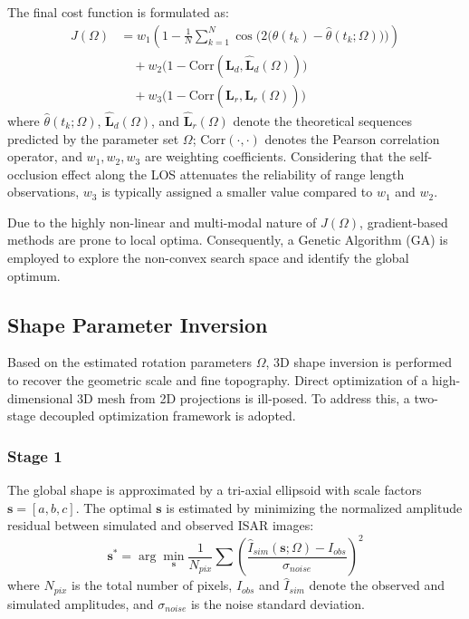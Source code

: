 \documentclass[conference]{IEEEtran}
\begin{document}
The final cost function is formulated as:
\begin{equation}
	\begin{split}
		J(\Omega) &= w_1 \left( 1 - \frac{1}{N} \sum_{k=1}^N \cos \Big( 2 \big( \theta(t_k) - \hat{\theta}(t_k; \Omega) \big) \Big) \right) \\
		&\quad + w_2 \big( 1 - \text{Corr}(\mathbf{L}_d, \hat{\mathbf{L}}_d(\Omega)) \big) \\
		&\quad + w_3 \big( 1 - \text{Corr}(\mathbf{L}_r, \hat{\mathbf{L}}_r(\Omega)) \big)
	\end{split}
\end{equation}
where $\hat{\theta}(t_k; \Omega)$, $\hat{\mathbf{L}}_d(\Omega)$, and $\hat{\mathbf{L}}_r(\Omega)$ denote the theoretical sequences predicted by the parameter set $\Omega$; $\text{Corr}(\cdot, \cdot)$ denotes the Pearson correlation operator, and $w_1, w_2, w_3$ are weighting coefficients. Considering that the self-occlusion effect along the LOS attenuates the reliability of range length observations, $w_3$ is typically assigned a smaller value compared to $w_1$ and $w_2$.

Due to the highly non-linear and multi-modal nature of $J(\Omega)$, gradient-based methods are prone to local optima. Consequently, a Genetic Algorithm (GA) is employed to explore the non-convex search space and identify the global optimum.  

\subsection{Shape Parameter Inversion}\label{Shape}

Based on the estimated rotation parameters $\Omega$, 3D shape inversion is performed to recover the geometric scale and fine topography. Direct optimization of a high-dimensional 3D mesh from 2D projections is ill-posed. To address this, a two-stage decoupled optimization framework is adopted.

\subsubsection{Stage 1}

The global shape is approximated by a tri-axial ellipsoid with scale factors $\mathbf{s} = [a, b, c]$. The optimal $\mathbf{s}$ is estimated by minimizing the normalized amplitude residual between simulated and observed ISAR images\cite{brozovic2010}:
\begin{equation}
	\mathbf{s}^* = \arg\min_{\mathbf{s}} \frac{1}{N_{pix}} \sum \left( \frac{\hat{I}_{sim}(\mathbf{s}; \Omega) - I_{obs}}{\sigma_{noise}} \right)^2
\end{equation}
where $N_{pix}$ is the total number of pixels, $I_{obs}$ and $\hat{I}_{sim}$ denote the observed and simulated amplitudes, and $\sigma_{noise}$ is the noise standard deviation.
\end{document}
